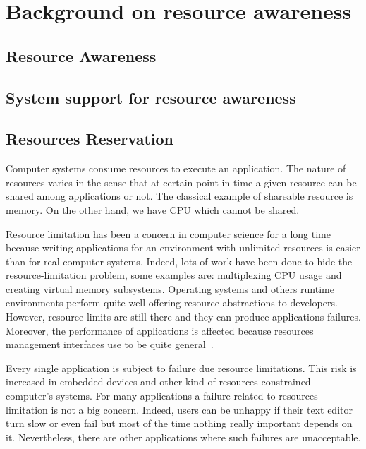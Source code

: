 \chapter{Background on resource awareness}
\label{chp:background_resource_awareness}


\section{Resource Awareness}

\section{System support for resource awareness}



%

\section{Resources Reservation}
Computer systems consume resources to execute an application.
The nature of resources varies in the sense that at certain point in time a given resource can be shared among applications or not.
The classical example of shareable resource is memory.
On the other hand, we have CPU which cannot be shared.

Resource limitation has been a concern in computer science for a long time because writing applications for an environment with unlimited resources is easier than for real computer systems.
Indeed, lots of work have been done to hide the resource-limitation problem, some examples are: multiplexing CPU usage and creating virtual memory subsystems.
Operating systems and others runtime environments perform quite well offering resource abstractions to developers.
However, resource limits are still there and they can produce applications failures. Moreover, the performance of applications is affected because resources management interfaces use to be quite general~\cite{Engler:1995:EOS:224056.224076}.

Every single application is subject to failure due resource limitations. This risk is increased in embedded devices and other kind of resources constrained computer's systems. For many applications a failure related to resources limitation is not a big concern.
Indeed, users can be unhappy if their text editor turn slow or even fail but most of the time nothing really important depends on it.
Nevertheless, there are other applications where such failures are unacceptable.

